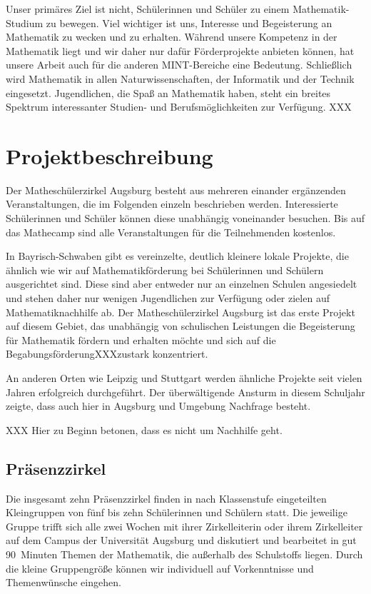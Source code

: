 \documentclass[12pt]{zettel}
\begin{document}
Unser primäres Ziel ist nicht, Schülerinnen und Schüler zu einem
Mathematik-Studium zu bewegen. Viel wichtiger ist uns, Interesse und
Begeisterung an Mathematik zu wecken und zu erhalten. Während unsere Kompetenz
in der Mathematik liegt und wir daher nur dafür Förderprojekte anbieten können,
hat unsere Arbeit auch für die anderen MINT-Bereiche eine Bedeutung.
Schließlich wird Mathematik in allen Naturwissenschaften, der Informatik und
der Technik eingesetzt. Jugendlichen, die Spaß an Mathematik haben, steht ein
breites Spektrum interessanter Studien- und Berufsmöglichkeiten zur Verfügung.
XXX


\section{Projektbeschreibung}

Der Matheschülerzirkel Augsburg besteht aus mehreren einander ergänzenden Veranstaltungen, die im
Folgenden einzeln beschrieben werden. Interessierte Schülerinnen und Schüler
können diese unabhängig voneinander besuchen. Bis auf das Mathecamp sind alle
Veranstaltungen für die Teilnehmenden kostenlos.

In Bayrisch-Schwaben gibt es vereinzelte, deutlich kleinere lokale
Projekte, die ähnlich wie wir auf Mathematikförderung bei Schülerinnen und
Schülern ausgerichtet sind. Diese sind aber entweder nur an einzelnen Schulen
angesiedelt und stehen daher nur wenigen Jugendlichen zur Verfügung oder zielen
auf Mathematiknachhilfe ab. Der Matheschülerzirkel Augsburg ist das erste
Projekt auf diesem Gebiet, das unabhängig von schulischen Leistungen die
Begeisterung für Mathematik fördern und erhalten möchte und sich auf die
BegabungsförderungXXXzustark konzentriert.

An anderen Orten wie Leipzig und Stuttgart werden ähnliche Projekte seit
vielen Jahren erfolgreich durchgeführt. Der überwältigende Ansturm in
diesem Schuljahr zeigte, dass auch hier in Augsburg und Umgebung Nachfrage
besteht.

XXX Hier zu Beginn betonen, dass es nicht um Nachhilfe geht.


\subsection{Präsenzzirkel}

Die insgesamt zehn Präsenzzirkel finden in nach Klassenstufe eingeteilten
Kleingruppen von fünf bis zehn Schülerinnen und Schülern statt.
Die jeweilige Gruppe trifft sich alle zwei Wochen mit ihrer Zirkelleiterin oder ihrem
Zirkelleiter auf dem Campus der Universität Augsburg und diskutiert und
bearbeitet in gut 90~Minuten Themen der Mathematik, die außerhalb des
Schulstoffs liegen. Durch die kleine Gruppengröße können wir individuell auf
Vorkenntnisse und Themenwünsche eingehen.
\end{document}
